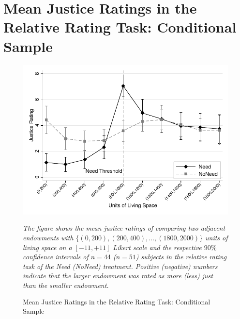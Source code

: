 \documentclass[12pt]{scrartcl}
\begin{document}
\clearpage
\section{Mean Justice Ratings in the Relative Rating Task: Conditional Sample}\label{sec:app_conditional_relative}
\begin{figure}[ht!]
   \centering
   \includegraphics{figures/figure_6.pdf}
   \begin{minipage}{\linewidth}
      \footnotesize
      \textit{The figure shows the mean justice ratings of comparing two adjacent endowments with $\{(0,200),(200,400),\ldots,(1800,2000)\}$ units of living space on a $[-11,+11]$ Likert scale and the respective $90\%$ confidence intervals of $n=44$ ($n=51$) subjects in the relative rating task of the Need (NoNeed) treatment. Positive (negative) numbers indicate that the larger endowment was rated as more (less) just than the smaller endowment.}
   \end{minipage}
   \caption{Mean Justice Ratings in the Relative Rating Task: Conditional Sample}
   \label{fig:relative_ratings_conditional}
\end{figure}
\end{document}
